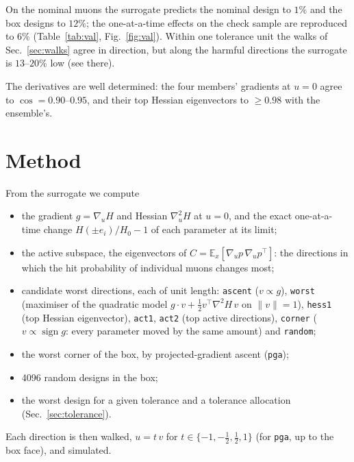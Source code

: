 \documentclass[11pt,a4paper]{article}
\begin{document}
On the nominal muons the surrogate predicts the nominal design to $1\%$ and the box designs to
$12\%$; the one-at-a-time effects on the check sample are reproduced to $6\%$ (Table~\ref{tab:val},
Fig.~\ref{fig:val}). Within one tolerance unit the walks of Sec.~\ref{sec:walks} agree in
direction, but along the harmful directions the surrogate is $13$--$20\%$ low (see there).

The derivatives are well determined: the four members' gradients at $u=0$ agree to
$\cos=0.90$--$0.95$, and their top Hessian eigenvectors to $\geq0.98$ with the ensemble's.

\section{Method}

From the surrogate we compute
\begin{itemize}
  \item the gradient $g=\nabla_u H$ and Hessian $\nabla^2_u H$ at $u=0$, and the exact
        one-at-a-time change $H(\pm e_i)/H_0-1$ of each parameter at its limit;
  \item the active subspace, the eigenvectors of $C=\mathbb{E}_x[\nabla_u p\,\nabla_u p^\top]$:
        the directions in which the hit probability of individual muons changes most;
  \item candidate worst directions, each of unit length:
    \texttt{ascent} ($v\propto g$),
    \texttt{worst} (maximiser of the quadratic model $g\cdot v+\tfrac12 v^\top\nabla^2H\,v$ on
    $\|v\|=1$),
    \texttt{hess1} (top Hessian eigenvector), \texttt{act1}, \texttt{act2} (top active
    directions), \texttt{corner} ($v\propto\operatorname{sign} g$: every parameter moved by the
    same amount) and \texttt{random};
  \item the worst corner of the box, by projected-gradient ascent (\texttt{pga});
  \item 4096 random designs in the box;
  \item the worst design for a given tolerance and a tolerance allocation
        (Sec.~\ref{sec:tolerance}).
\end{itemize}
Each direction is then walked, $u=t\,v$ for $t\in\{-1,-\tfrac12,\tfrac12,1\}$ (for \texttt{pga},
up to the box face), and simulated.

\end{document}
